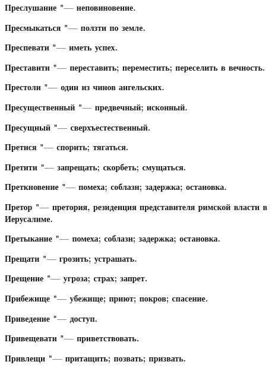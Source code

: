 \bfseries Преслушание \normalfont{} "--- неповиновение. 




\bfseries Пресмыкаться \normalfont{} "--- ползти по земле. 




\bfseries Преспевати \normalfont{} "--- иметь успех. 




\bfseries Преставити \normalfont{} "--- переставить; переместить; переселить в вечность. 




\bfseries Престоли \normalfont{} "--- один из чинов ангельских. 




\bfseries Пресущественный \normalfont{} "--- предвечный; исконный. 




\bfseries Пресущный \normalfont{} "--- сверхъестественный. 




\bfseries Претися \normalfont{} "--- спорить; тягаться. 




\bfseries Претити \normalfont{} "--- запрещать; скорбеть; смущаться. 




\bfseries Преткновение \normalfont{} "--- помеха; соблазн; задержка; остановка. 




\bfseries Претор \normalfont{} "--- претория, резиденция представителя римской власти в Иерусалиме. 




\bfseries Претыкание \normalfont{} "--- помеха; соблазн; задержка; остановка. 




\bfseries Прещати \normalfont{} "--- грозить; устрашать. 




\bfseries Прещение \normalfont{} "--- угроза; страх; запрет. 




\bfseries Прибежище \normalfont{} "--- убежище; приют; покров; спасение. 




\bfseries Приведение \normalfont{} "--- доступ. 




\bfseries Привещевати \normalfont{} "--- приветствовать. 




\bfseries Привлещи \normalfont{} "--- притащить; позвать; призвать. 




